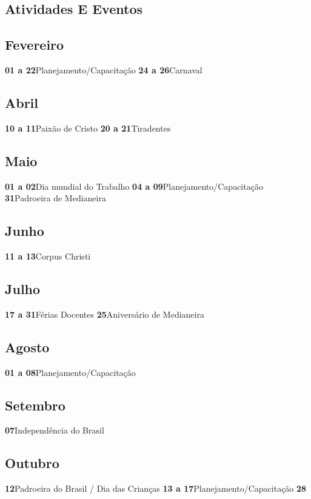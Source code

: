 \documentclass[thesis]{hmcposter}
\begin{document}
\begin{poster}
\normalsize \section{\color{hmcorange}Atividades E Eventos}\subsection{Fevereiro}\textbf{01 a 22}\quad \quad Planejamento/Capacitação \newline\textbf{24 a 26}\quad \quad Carnaval \newline\subsection{Abril}\textbf{10 a 11}\quad \quad Paixão de Cristo \newline\textbf{20 a 21}\quad \quad Tiradentes \newline\subsection{Maio}\textbf{01 a 02}\quad \quad Dia mundial do Trabalho \newline\textbf{04 a 09}\quad \quad Planejamento/Capacitação \newline\textbf{31}\quad \quad \quad \quad Padroeira de Medianeira \newline\subsection{Junho}\textbf{11 a 13}\quad \quad Corpus Christi \newline\subsection{Julho}\textbf{17 a 31}\quad \quad Férias Docentes \newline\textbf{25}\quad \quad \quad \quad Aniversário de Medianeira \newline\subsection{Agosto}\textbf{01 a 08}\quad \quad Planejamento/Capacitação \newline\subsection{Setembro}\textbf{07}\quad \quad \quad \quad Independência do Brasil \newline\subsection{Outubro}\textbf{12}\quad \quad \quad \quad Padroeira do Brasil / Dia das Crianças \newline\textbf{13 a 17}\quad \quad Planejamento/Capacitação \newline\textbf{28}\quad 
\end{poster}
\end{document}
